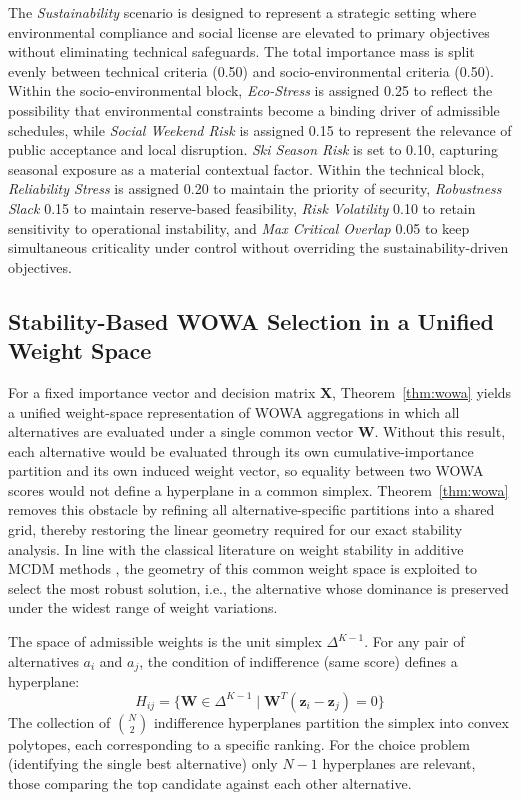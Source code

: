 The \textit{Sustainability} scenario is designed to represent a strategic setting where environmental compliance and social license are elevated to primary objectives without eliminating technical safeguards. The total importance mass is split evenly between technical criteria (0.50) and socio-environmental criteria (0.50). Within the socio-environmental block, \textit{Eco-Stress} is assigned 0.25 to reflect the possibility that environmental constraints become a binding driver of admissible schedules, while \textit{Social Weekend Risk} is assigned 0.15 to represent the relevance of public acceptance and local disruption. \textit{Ski Season Risk} is set to 0.10, capturing seasonal exposure as a material contextual factor. Within the technical block, \textit{Reliability Stress} is assigned 0.20 to maintain the priority of security, \textit{Robustness Slack} 0.15 to maintain reserve-based feasibility, \textit{Risk Volatility} 0.10 to retain sensitivity to operational instability, and \textit{Max Critical Overlap} 0.05 to keep simultaneous criticality under control without overriding the sustainability-driven objectives.

\subsection{Stability-Based WOWA Selection in a Unified Weight Space}

For a fixed importance vector and decision matrix $\mathbf{X}$, Theorem~\ref{thm:wowa} yields a unified weight-space representation of WOWA aggregations in which all alternatives are evaluated under a single common vector $\mathbf{W}$. Without this result, each alternative would be evaluated through its own cumulative-importance partition and its own induced weight vector, so equality between two WOWA scores would not define a hyperplane in a common simplex. Theorem~\ref{thm:wowa} removes this obstacle by refining all alternative-specific partitions into a shared grid, thereby restoring the linear geometry required for our exact stability analysis. In line with the classical literature on weight stability in additive MCDM methods \cite{mareschal1988weight}, the geometry of this common weight space is exploited to select the most robust solution, i.e., the alternative whose dominance is preserved under the widest range of weight variations.

The space of admissible weights is the unit simplex $\Delta^{K-1}$. For any pair of alternatives $a_i$ and $a_j$, the condition of indifference (same score) defines a hyperplane:
\[
H_{ij} = \{ \mathbf{W} \in \Delta^{K-1} \mid \mathbf{W}^T(\mathbf{z}_i - \mathbf{z}_j) = 0 \}
\]
The collection of $\binom{N}{2}$ indifference hyperplanes partition the simplex into convex polytopes, each corresponding to a specific ranking. For the choice problem (identifying the single best alternative) only $N-1$ hyperplanes are relevant, those comparing the top candidate against each other alternative.

